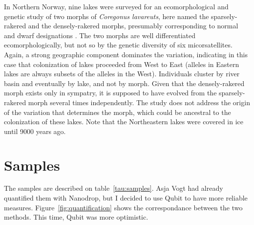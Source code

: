 \documentclass[a4paper,12pt,twosided]{article}
\begin{document}
In Northern Norway, nine lakes were surveyed for an ecomorphological and genetic study of two morphs of \emph{Coregonus lavareuts}, here named the sparsely-rakered and the densely-rakered morphs, presumably corresponding to normal and dwarf designations \cite{Ostbye2006}. The two morphs are well differentiated ecomorphologically, but not so by the genetic diversity of six micorsatellites. Again, a strong geographic component dominates the variation, indicating in this case that colonization of lakes proceeded from West to East (alleles in Eastern lakes are always subsets of the alleles in the West). Individuals cluster by river basin and eventually by lake, and not by morph. Given that the densely-rakered morph exists only in sympatry, it is supposed to have evolved from the sparsely-rakered morph several times independently. The study does not address the origin of the variation that determines the morph, which could be ancestral to the colonization of these lakes. Note that the Northeastern lakes were covered in ice until 9000 years ago.

\section{Samples}
The samples are described on table~\ref{tau:samples}. Asja Vogt had already quantified them with Nanodrop, but I decided to use Qubit to have more reliable measures. Figure~\ref{fig:quantification} shows the correspondance between the two methods. This time, Qubit was more optimistic. 
\end{document}
